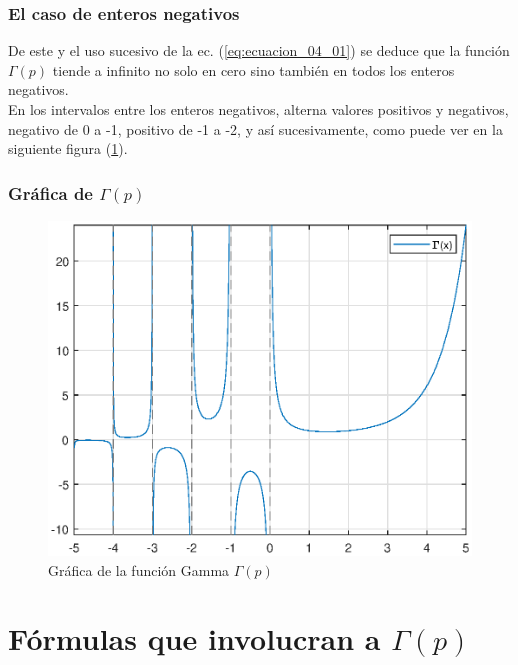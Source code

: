\begin{frame}
\frametitle{El caso de enteros negativos}
De este y el uso sucesivo de la ec. (\ref{eq:ecuacion_04_01}) se deduce que la función $\Gamma (p)$ tiende a infinito no solo en cero sino también en todos los enteros negativos.
\\
\bigskip
\pause
En los intervalos entre los enteros negativos, alterna valores positivos y negativos, negativo de 0 a -1, positivo de -1 a -2, y así sucesivamente, como puede ver en la siguiente figura (\ref{fig:figura_plot_gamma}).
\end{frame}
\begin{frame}
\frametitle{Gráfica de $\Gamma (p)$}
\begin{figure}[h!]
   \centering
   \includegraphics[scale=0.55]{Imagenes/Plot_Gamma.eps}
   \caption{Gráfica de la función Gamma $\Gamma (p)$}
   \label{fig:figura_plot_gamma}
\end{figure}
\end{frame}
\section{Fórmulas que involucran a \texorpdfstring{$\Gamma (p)$}{}}
